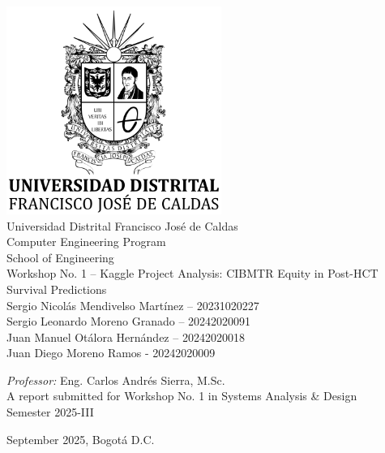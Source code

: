 \documentclass[a4paper,11pt,oneside]{book}
\begin{document}
    
    \frontmatter
    
    \begin{titlepage}      
        \begin{center}
            \includegraphics[width=7cm]{figures/UDLogo.png}\\[0.3cm]
            {\LARGE Universidad Distrital Francisco José de Caldas\\[0.3cm]
            Computer Engineering Program\\[0.3cm]
            School of Engineering}\\[2cm]
			
            \linespread{1.0}\huge {
                Workshop No. 1 -- Kaggle Project Analysis: CIBMTR Equity in Post-HCT Survival Predictions
            }
            \linespread{1}~\\[2cm]
            {\Large 
                Sergio Nicolás Mendivelso Martínez -- 20231020227\\
                Sergio Leonardo Moreno Granado -- 20242020091\\
                Juan Manuel Otálora Hernández -- 20242020018\\
                Juan Diego Moreno Ramos - 20242020009\\
            }
            

            {\Large 
                \emph{Professor:} Eng. Carlos Andrés Sierra, M.Sc.}\\[1cm]
            
    		\large A report submitted for Workshop No. 1 in Systems Analysis \& Design\\
            Semester 2025-III 
            \\[0.3cm] 
            \vfill
            
            
            September 2025, Bogotá D.C.
        \end{center}
    \end{titlepage}
\end{document}
